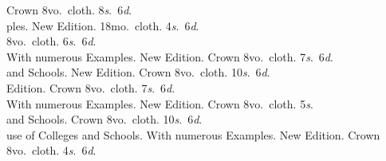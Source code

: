 \documentclass{book}[2004/02/16]
\begin{document}
\noindent\hangindent\parindent{\LARGE Key to the Trigonometry for Beginners.}
\linebreak
Crown 8vo.\ cloth. 8\textit{s}.\ 6\textit{d}.\\[.5ex]

\noindent\hangindent\parindent{\LARGE Mechanics for Beginners. With numerous Exam-}
\linebreak
ples. New Edition. 18mo.\ cloth. 4\textit{s}.\ 6\textit{d}.\\[.5ex]

\noindent\hangindent\parindent{\LARGE Key to the Mechanics for Beginners. Crown}
\linebreak
8vo.\ cloth. 6\textit{s}.\ 6\textit{d}.\\[.5ex]

\noindent\hangindent\parindent{\LARGE Algebra for the use of Colleges and Schools.}
\linebreak
With numerous Examples. New Edition. Crown 8vo.\ cloth. 7\textit{s}.\ 6\textit{d}.\\[.5ex]

\noindent\hangindent\parindent{\LARGE Key to the Algebra for the use of Colleges}
\linebreak
and Schools. New Edition. Crown 8vo.\ cloth. 10\textit{s}.\ 6\textit{d}.\\[.5ex]

\noindent\hangindent\parindent{\LARGE A Treatise on the Theory of Equations. New}
\linebreak
Edition. Crown 8vo.\ cloth. 7\textit{s}.\ 6\textit{d}.\\[.5ex]



\noindent\hangindent\parindent{\LARGE Plane Trigonometry for Colleges and Schools.}
\linebreak
With numerous Examples. New Edition. Crown 8vo.\ cloth. 5\textit{s}.\\[.5ex]

\noindent\hangindent\parindent{\LARGE Key to the Plane Trigonometry for Colleges}
\linebreak
and Schools. Crown 8vo.\ cloth. 10\textit{s}.\ 6\textit{d}.\\[.5ex]

\noindent\hangindent\parindent{\LARGE A Treatise on Spherical Trigonometry for the}
\linebreak
use of Colleges and Schools. With numerous Examples. New
Edition. Crown 8vo.\ cloth. 4\textit{s}.\ 6\textit{d}.\\[.5ex]
\end{document}
